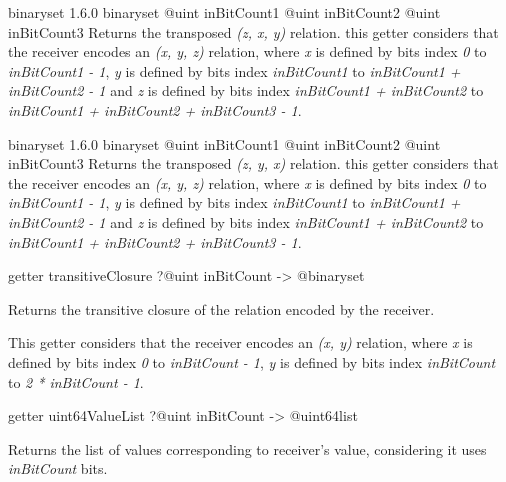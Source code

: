 {binaryset}
{1.6.0}
{binaryset}
{@uint inBitCount1}
{@uint inBitCount2}
{@uint inBitCount3}
{Returns the transposed \emph{(z, x, y)} relation.}
{this getter considers that the receiver encodes an \emph{(x, y, z)} relation, where \emph{x} is defined by bits index \emph{0} to \emph{inBitCount1  - 1}, \emph{y} is defined by bits index \emph{inBitCount1} to \emph{inBitCount1 + inBitCount2 - 1} and  \emph{z} is defined by bits index \emph{inBitCount1 + inBitCount2} to \emph{inBitCount1 + inBitCount2 + inBitCount3 - 1}.}







{binaryset}
{1.6.0}
{binaryset}
{@uint inBitCount1}
{@uint inBitCount2}
{@uint inBitCount3}
{Returns the transposed \emph{(z, y, x)} relation.}
{this getter considers that the receiver encodes an \emph{(x, y, z)} relation, where \emph{x} is defined by bits index \emph{0} to \emph{inBitCount1  - 1}, \emph{y} is defined by bits index \emph{inBitCount1} to \emph{inBitCount1 + inBitCount2 - 1} and  \emph{z} is defined by bits index \emph{inBitCount1 + inBitCount2} to \emph{inBitCount1 + inBitCount2 + inBitCount3 - 1}.}









\begin{galgascode}
getter transitiveClosure ?@uint inBitCount -> @binaryset
\end{galgascode}


Returns the transitive closure of the relation encoded by the receiver.

This getter considers that the receiver encodes an \emph{(x, y)} relation, where \emph{x} is defined by bits index \emph{0} to \emph{inBitCount  - 1}, \emph{y} is defined by bits index \emph{inBitCount} to \emph{2 * inBitCount - 1}.









\begin{galgascode}
getter uint64ValueList ?@uint inBitCount -> @uint64list
\end{galgascode}


Returns the list of  values corresponding to receiver's value, considering it uses \emph{inBitCount} bits.








